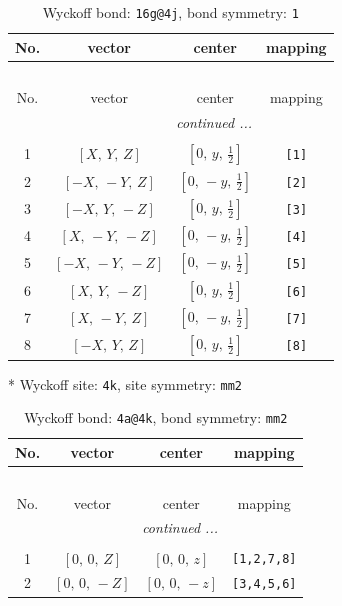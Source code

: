 \documentclass[fleqn,8pt]{jsarticle}
\begin{document}
\begin{longtable}{cccc}
\caption{Wyckoff bond: {\tt 16g@4j}, bond symmetry: {\tt 1}}
 \\
 \hline \hline
No. & vector & center & mapping \\ \hline \endfirsthead

\multicolumn{3}{l}{\tablename\ \thetable{}} \\
 \hline \hline
No. & vector & center & mapping \\ \hline \endhead

 \hline \hline
\multicolumn{3}{r}{\footnotesize\it continued ...} \\ \endfoot

 \hline \hline
\multicolumn{3}{r}{} \\ \endlastfoot

1 & $\left[ X,\, Y,\, Z \right]$ & $\left[ 0,\, y,\, \frac{1}{2} \right]$ & {\tt [1]} \\ \hline
2 & $\left[ - X,\, - Y,\, Z \right]$ & $\left[ 0,\, - y,\, \frac{1}{2} \right]$ & {\tt [2]} \\ \hline
3 & $\left[ - X,\, Y,\, - Z \right]$ & $\left[ 0,\, y,\, \frac{1}{2} \right]$ & {\tt [3]} \\ \hline
4 & $\left[ X,\, - Y,\, - Z \right]$ & $\left[ 0,\, - y,\, \frac{1}{2} \right]$ & {\tt [4]} \\ \hline
5 & $\left[ - X,\, - Y,\, - Z \right]$ & $\left[ 0,\, - y,\, \frac{1}{2} \right]$ & {\tt [5]} \\ \hline
6 & $\left[ X,\, Y,\, - Z \right]$ & $\left[ 0,\, y,\, \frac{1}{2} \right]$ & {\tt [6]} \\ \hline
7 & $\left[ X,\, - Y,\, Z \right]$ & $\left[ 0,\, - y,\, \frac{1}{2} \right]$ & {\tt [7]} \\ \hline
8 & $\left[ - X,\, Y,\, Z \right]$ & $\left[ 0,\, y,\, \frac{1}{2} \right]$ & {\tt [8]} \\
\end{longtable}
* Wyckoff site: {\tt 4k}, site symmetry: {\tt mm2}
\renewcommand{\arraystretch}{1.2}
\begin{longtable}{cccc}
\caption{Wyckoff bond: {\tt 4a@4k}, bond symmetry: {\tt mm2}}
 \\
 \hline \hline
No. & vector & center & mapping \\ \hline \endfirsthead

\multicolumn{3}{l}{\tablename\ \thetable{}} \\
 \hline \hline
No. & vector & center & mapping \\ \hline \endhead

 \hline \hline
\multicolumn{3}{r}{\footnotesize\it continued ...} \\ \endfoot

 \hline \hline
\multicolumn{3}{r}{} \\ \endlastfoot

1 & $\left[ 0,\, 0,\, Z \right]$ & $\left[ 0,\, 0,\, z \right]$ & {\tt [1,2,7,8]} \\ \hline
2 & $\left[ 0,\, 0,\, - Z \right]$ & $\left[ 0,\, 0,\, - z \right]$ & {\tt [3,4,5,6]} \\
\end{longtable}
\end{document}
